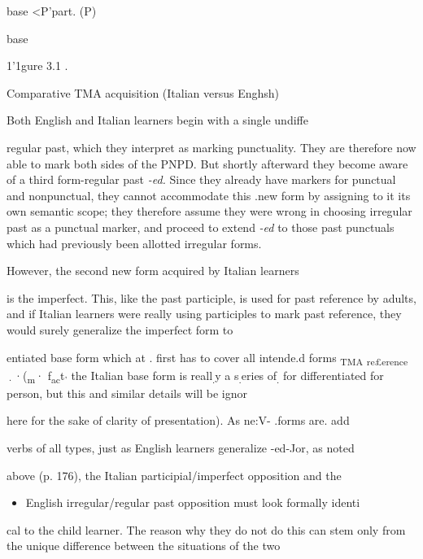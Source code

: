 base {\textless}P{\textquotedbl}'part. (P)

base

1'1gure 3.1 .

Comparative TMA acquisition (Italian versus Enghsh)

Both English and Italian learners begin with a single undiffe

regular past, which they interpret as marking punctuality. They are therefore now able to mark both sides of the PNPD. But shortly after\-ward they become aware of a third form-regular past \textit{{}-ed.} Since they already have markers for punctual and nonpunctual, they cannot ac\-commodate this .new form by assigning to it its own semantic scope; they therefore assume they were wrong in choosing irregular past as a punctual marker, and proceed to extend \textit{{}-ed} to those past punc\-tuals which had previously been allotted irregular forms.

However, the second new form acquired by Italian learners

is the imperfect. This, like the past participle, is used for past reference by adults, and if Italian learners were really using participles to mark past reference, they would surely generalize the imperfect form to

entiated base form which at . first has to cover all intende.d forms \textsubscript{TMA}\textsubscript{ }\textsubscript{r}\textsubscript{e}\textsubscript{£}\textsubscript{erence}\textsubscript{ }\textsubscript{·}·(\textsubscript{m}· f\textsubscript{a}\textsubscript{c}t\textsubscript{'}\textsubscript{ }the Italian base form is reall\textsubscript{.}y a s\textsubscript{.}eries of\textsubscript{.}\textsubscript{ }for differentiated for person, but this and similar details will be ignor

here for the sake of clarity of presentation). As ne:V- .forms are. add

verbs of all types, just as English learners generalize {}-ed-Jor, as noted

above (p. 176), the Italian participial/imperfect opposition and the

\begin{itemize}
\item English irregular/regular past opposition must look formally identi\-
\end{itemize}

cal to the child learner. The reason why they do not do this can stem only from the unique difference between the situations of the two

